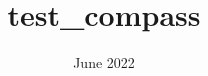 \documentclass{article}
\title{test_compass}
\date{June 2022}
\begin{document}
\begin{figure}[!th]
\centering

\label{fig:compass}
\end{figure}
\end{document}
